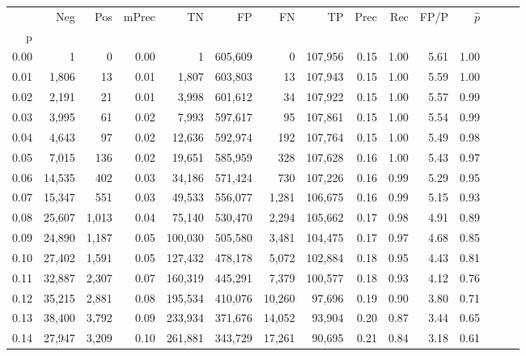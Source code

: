 \begin{tabular}{rrrrrrrrrrrrrrr}
\toprule
{} &     Neg &    Pos & mPrec &       TN &       FP &       FN &       TP &  Prec &   Rec &  FP/P & $\hat{p}$ \\
p    &         &        &       &          &          &          &          &       &       &       &           \\
\midrule
0.00 &       1 &      0 &  0.00 &        1 &  605,609 &        0 &  107,956 &  0.15 &  1.00 &  5.61 &      1.00 \\
0.01 &   1,806 &     13 &  0.01 &    1,807 &  603,803 &       13 &  107,943 &  0.15 &  1.00 &  5.59 &      1.00 \\
0.02 &   2,191 &     21 &  0.01 &    3,998 &  601,612 &       34 &  107,922 &  0.15 &  1.00 &  5.57 &      0.99 \\
0.03 &   3,995 &     61 &  0.02 &    7,993 &  597,617 &       95 &  107,861 &  0.15 &  1.00 &  5.54 &      0.99 \\
0.04 &   4,643 &     97 &  0.02 &   12,636 &  592,974 &      192 &  107,764 &  0.15 &  1.00 &  5.49 &      0.98 \\
0.05 &   7,015 &    136 &  0.02 &   19,651 &  585,959 &      328 &  107,628 &  0.16 &  1.00 &  5.43 &      0.97 \\
0.06 &  14,535 &    402 &  0.03 &   34,186 &  571,424 &      730 &  107,226 &  0.16 &  0.99 &  5.29 &      0.95 \\
0.07 &  15,347 &    551 &  0.03 &   49,533 &  556,077 &    1,281 &  106,675 &  0.16 &  0.99 &  5.15 &      0.93 \\
0.08 &  25,607 &  1,013 &  0.04 &   75,140 &  530,470 &    2,294 &  105,662 &  0.17 &  0.98 &  4.91 &      0.89 \\
0.09 &  24,890 &  1,187 &  0.05 &  100,030 &  505,580 &    3,481 &  104,475 &  0.17 &  0.97 &  4.68 &      0.85 \\
0.10 &  27,402 &  1,591 &  0.05 &  127,432 &  478,178 &    5,072 &  102,884 &  0.18 &  0.95 &  4.43 &      0.81 \\
0.11 &  32,887 &  2,307 &  0.07 &  160,319 &  445,291 &    7,379 &  100,577 &  0.18 &  0.93 &  4.12 &      0.76 \\
0.12 &  35,215 &  2,881 &  0.08 &  195,534 &  410,076 &   10,260 &   97,696 &  0.19 &  0.90 &  3.80 &      0.71 \\
0.13 &  38,400 &  3,792 &  0.09 &  233,934 &  371,676 &   14,052 &   93,904 &  0.20 &  0.87 &  3.44 &      0.65 \\
0.14 &  27,947 &  3,209 &  0.10 &  261,881 &  343,729 &   17,261 &   90,695 &  0.21 &  0.84 &  3.18 &      0.61 \\

\end{tabular}
